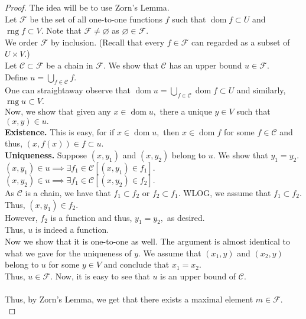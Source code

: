 \documentclass{article}
\newcommand{\rng}{\operatorname{rng}}
\newcommand{\dom}{\operatorname{dom}}
\let\emptyset\varnothing
\begin{document}
\begin{proof}
	The idea will be to use Zorn's Lemma.\\
	Let $\mathcal{F}$ be the set of all one-to-one functions $f$ such that $\dom f \subset U$ and $\rng f \subset V.$ Note that $\mathcal{F} \neq \emptyset$ as $\emptyset \in \mathcal{F}.$\\
	We order $\mathcal{F}$ by inclusion. (Recall that every $f \in \mathcal{F}$ can regarded as a subset of $U \times V.$)\\
	Let $\mathcal{C} \subset \mathcal{F}$ be a chain in $\mathcal{F}.$ We show that $\mathcal{C}$ has an upper bound $u \in \mathcal{F}.$\\
	Define $u = \displaystyle\bigcup_{f \in \mathcal{C}}f.$\\
	One can straightaway observe that $\dom u = \displaystyle\bigcup_{f \in \mathcal{C}} \dom f \subset U$ and similarly, $\rng u \subset V.$\\
	Now, we show that given any $x \in \dom u,$ there a unique $y \in V$ such that $(x, y) \in u.$\\
	\textbf{Existence.} This is easy, for if $x \in \dom u,$ then $x \in \dom f$ for some $f \in \mathcal{C}$ and thus, $(x, f(x)) \in f \subset u.$\\
	\textbf{Uniqueness.} Suppose $(x, y_1)$ and $(x, y_2)$ belong to $u.$ We show that $y_1 = y_2.$\\
	$(x, y_1) \in u \implies \exists f_1 \in \mathcal{C} [(x, y_1) \in f_1].$\\
	$(x, y_2) \in u \implies \exists f_1 \in \mathcal{C} [(x, y_2) \in f_2].$\\
	As $\mathcal{C}$ is a chain, we have that $f_1 \subset f_2$ or $f_2 \subset f_1.$ WLOG, we assume that $f_1 \subset f_2.$ Thus, $(x, y_1) \in f_2.$\\
	However, $f_2$ is a function and thus, $y_1 = y_2,$ as desired.\\
	Thus, $u$ is indeed a function. \\
	Now we show that it is one-to-one as well. The argument is almost identical to what we gave for the uniqueness of $y.$ We assume that $(x_1, y)$ and $(x_2, y)$ belong to $u$ for some $y \in V$ and conclude that $x_1 = x_2.$\\
	Thus, $u \in \mathcal{F}.$ Now, it is easy to see that $u$ is an upper bound of $\mathcal{C}.$\\~\\
	Thus, by Zorn's Lemma, we get that there exists a maximal element $m \in \mathcal{F}.$\\

\end{proof}
\end{document}
